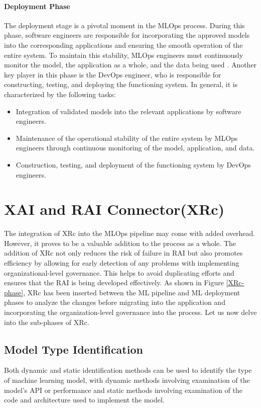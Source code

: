 \documentclass[conference]{IEEEtran}
\begin{document}
\paragraph{Deployment Phase} The deployment stage is a pivotal moment in the MLOps process. During this phase, software engineers are responsible for incorporating the approved models into the corresponding applications and ensuring the smooth operation of the entire system. To maintain this stability, MLOps engineers must continuously monitor the model, the application as a whole, and the data being used \cite{treveil2020introducing}. Another key player in this phase is the DevOps engineer, who is responsible for constructing, testing, and deploying the functioning system. In general, it is characterized by the following tasks:
\begin{itemize}
	\item Integration of validated models into the relevant applications by software engineers.
	\item Maintenance of the operational stability of the entire system by MLOps engineers through continuous monitoring of the model, application, and data.
	\item Construction, testing, and deployment of the functioning system by DevOps engineers.
\end{itemize}

\section{XAI and RAI Connector(XRc)}
The integration of XRc into the MLOps pipeline may come with added overhead. However, it proves to be a valuable addition to the process as a whole. The addition of XRc not only reduces the risk of failure in RAI but also promotes efficiency by allowing for early detection of any problems with implementing organizational-level governance. This helps to avoid duplicating efforts and ensures that the RAI is being developed effectively. As shown in Figure \ref{XRc-phase}, XRc has been inserted between the ML pipeline and ML deployment phases to analyze the changes before migrating into the application and incorporating the organization-level governance into the process. Let us now delve into the sub-phases of XRc.

\subsection{Model Type Identification}
Both dynamic and static identification methods can be used to identify the type of machine learning model, with dynamic methods involving examination of the model's API or performance and static methods involving examination of the code and architecture used to implement the model.
\end{document}
